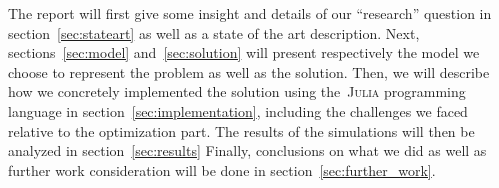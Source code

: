 The report will first give some insight and details of our ``research'' question 
in section~\ref{sec:stateart} as well as a state of the art description.
Next, sections~\ref{sec:model} and~\ref{sec:solution} will present respectively 
the model we choose to represent the problem as well as the solution.
Then, we will describe how we concretely implemented the solution using the~\textsc{Julia}
programming language in section~\ref{sec:implementation}, including the challenges
we faced relative to the optimization part.
The results of the simulations will then be analyzed in section~\ref{sec:results}
Finally, conclusions on what we did as well as further work consideration
will be done in section~\ref{sec:further_work}.
